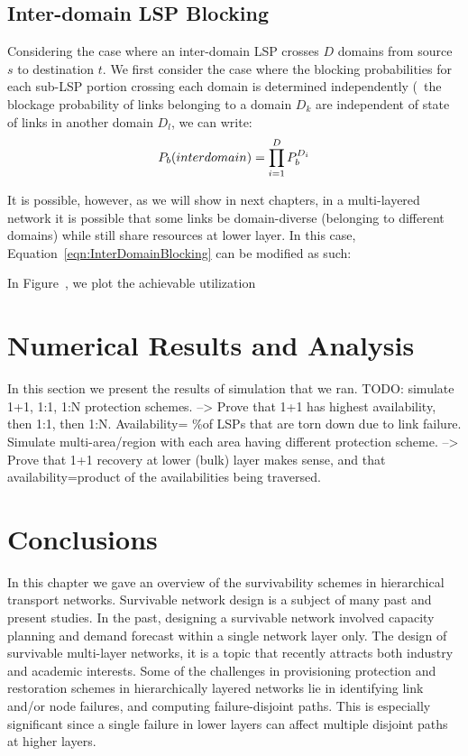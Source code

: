 \subsection{Inter-domain LSP Blocking}
Considering the case where an inter-domain LSP crosses $D$ domains from source $s$ to destination $t$. We first consider the case where the blocking probabilities for each sub-LSP portion crossing each domain is determined independently (\ie\ the blockage probability of links belonging to a domain $D_k$ are independent of state of links in another domain $D_l$, we can write:
\begin{equation}
\label{eqn:InterDomainBlocking}
P_b(inter\-domain) = \prod_{i=1}^{D} P_b^{D_i}
\end{equation}

It is possible, however, as we will show in next chapters, in a multi-layered network it is possible that some links be domain-diverse (belonging to different domains) while still share resources at lower layer. In this case, Equation~\ref{eqn:InterDomainBlocking} can be modified as such:

In Figure~, we plot the achievable utilization 


\section{Numerical Results and Analysis}

In this section we present the results of simulation that we ran.
TODO: simulate 1+1, 1:1, 1:N protection schemes. --> Prove that 1+1
has highest availability, then 1:1, then 1:N. Availability= \%of LSPs
that are torn down due to link failure. Simulate multi-area/region
with each area having different protection scheme. --> Prove that
1+1 recovery at lower (bulk) layer makes sense, and that availability=product
of the availabilities being traversed.

\section{Conclusions}

In this chapter we gave an overview of the survivability schemes in
hierarchical transport networks. Survivable network design is a subject
of many past and present studies. In the past, designing a survivable
network involved capacity planning and demand forecast within a single
network layer only. The design of survivable multi-layer networks,
it is a topic that recently attracts both industry and academic interests.
Some of the challenges in provisioning protection and restoration
schemes in hierarchically layered networks lie in identifying link
and/or node failures, and computing failure-disjoint paths. This is
especially significant since a single failure in lower layers can
affect multiple disjoint paths at higher layers.

